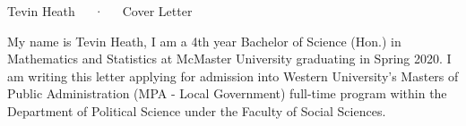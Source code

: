 \documentclass[11pt, a4paper]{awesome-cv}
\begin{document}
\makecvheader[C]

\makecvfooter
  {}
  {Tevin Heath~~~·~~~Cover Letter}
  {\thepage}

\makelettertitle

\begin{cvletter}
\setlength\parindent{24pt}


My name is Tevin Heath, I am a 4th year Bachelor of Science (Hon.) in Mathematics and Statistics at McMaster University graduating in Spring 2020. I am writing this letter applying for admission into Western University’s Masters of Public Administration (MPA - Local Government) full-time program within the Department of Political Science under the Faculty of Social Sciences. 


\end{cvletter}
\end{document}
